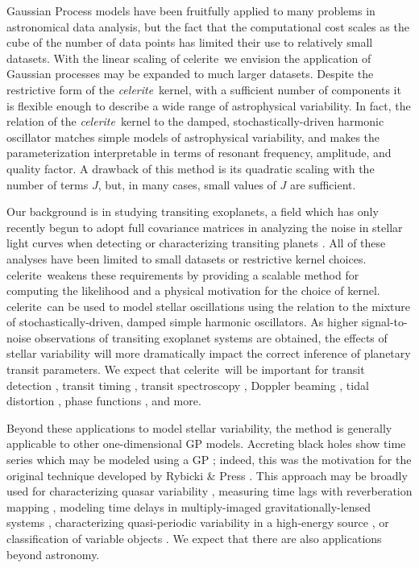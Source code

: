 \documentclass[manuscript, letterpaper]{aastex6}
\newcommand{\project}[1]{\textsf{#1}}
\newcommand{\celerite}{\project{celerite}}
\newcommand{\celeriteterm}{\emph{celerite}}
\begin{document}
Gaussian Process models have been fruitfully applied to many problems in
astronomical data analysis, but the fact that the computational cost scales as
the cube of the number of data points has limited their use to relatively
small datasets.
With the linear scaling of \celerite\, we envision the application of Gaussian
processes may be expanded to much larger datasets.
Despite the restrictive form of the \celeriteterm\ kernel, with a sufficient
number of components it is flexible enough to describe a wide range of
astrophysical variability.
In fact, the relation of the \celeriteterm\ kernel to the damped, stochastically-driven harmonic
oscillator matches simple models of astrophysical variability, and makes the
parameterization interpretable in terms of resonant frequency, amplitude, and
quality factor.
A drawback of this method is its quadratic scaling with the number of
terms $J$, but, in many cases, small values of $J$ are sufficient.

Our background is in studying transiting exoplanets, a field which has only
recently begun to adopt full covariance matrices in analyzing the noise in
stellar light curves when detecting or characterizing transiting planets
\citep[for example,][]{Carter:2009, Gibson:2012, Barclay:2015, Evans:2015,
Aigrain:2016, Foreman-Mackey:2016b, Grunblatt:2016, Luger:2016}.
All of these analyses have been limited to small datasets or restrictive
kernel choices.
\celerite\ weakens these requirements by providing a scalable method for
computing the likelihood and a physical motivation for the choice of kernel.
\celerite\ can be used to model stellar oscillations using the relation to the
mixture of stochastically-driven, damped simple harmonic oscillators.
As higher signal-to-noise observations of transiting exoplanet systems are
obtained, the effects of stellar variability will more dramatically impact the
correct inference of planetary transit parameters.
We expect that \celerite\ will be important for transit detection
\citep{Pope:2016, Foreman-Mackey:2016b}, transit timing \citep{Agol:2005,
Holman:2005}, transit spectroscopy \citep{Brown:2001}, Doppler beaming
\citep{Loeb:2003, Zucker:2007}, tidal distortion \citep{Zucker:2007}, phase
functions \citep{Knutson:2007, Zucker:2007}, and more.

Beyond these applications to model stellar variability, the method is
generally applicable to other one-dimensional GP models.
Accreting black holes show time series which may be modeled using a GP
\citep{Kelly:2014}; indeed, this was the motivation for the original technique
developed by Rybicki \& Press \citep{Rybicki:1992, Rybicki:1995}.
This approach may be broadly used for characterizing quasar variability
\citep{MacLeod:2010}, measuring time lags with reverberation mapping
\citep{Zu:2011, Pancoast:2014}, modeling time delays in multiply-imaged
gravitationally-lensed systems \citep{Press:1998}, characterizing
quasi-periodic variability in a high-energy source \citep{McAllister:2016}, or
classification of variable objects \citep{Zinn:2016}.
We expect that there are also applications beyond astronomy.
\end{document}
